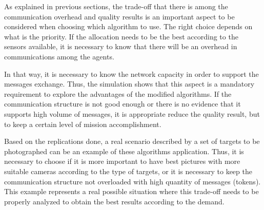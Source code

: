 As explained in previous sections, the trade-off that there is among the communication overhead and quality results is an important aspect to be considered when choosing which algorithm to use. The right choice depends on what is the priority. If the allocation needs to be the best according to the sensors available, it is necessary to know that there will be an overhead in communications among the agents. 

In that way, it is necessary to know the network capacity in order to support the messages exchange. Thus, the simulation shows that this aspect is a mandatory requirement to explore the advantages of the modified algorithms. If the communication structure is not good enough or there is no evidence that it supports high volume of messages, it is appropriate reduce the quality result, but to keep a certain level of mission accomplishment.

Based on the replications done, a real scenario described by a set of targets to be photographed can be an example of these algorithms application. Thus, it is necessary to choose if it is more important to have best pictures with more suitable cameras according to the type of targets, or it is necessary to keep the communication structure not overloaded with high quantity of messages (tokens). This example represents a real possible situation where this trade-off needs to be properly analyzed to obtain the best results according to the demand.
